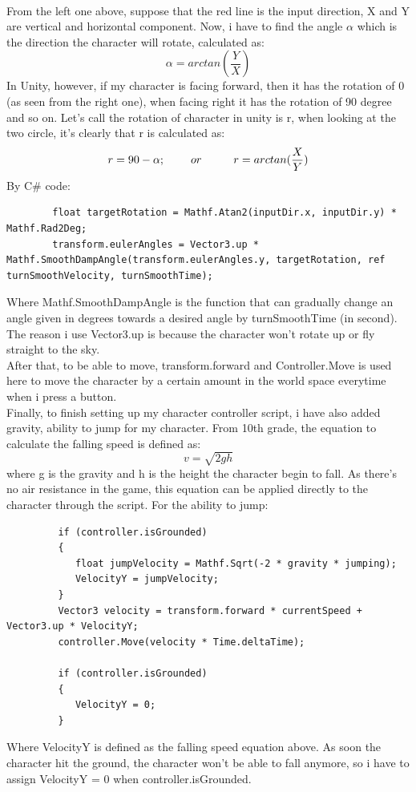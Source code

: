 \documentclass[a4paper, 13pt]{extarticle}
\begin{document}
 	 	\\[0.02cm]
 	 	From the left one above, suppose that the red line is the input direction, X and Y are vertical and horizontal component. Now, i have to find the angle {$\alpha$} which is the direction the character will rotate, calculated as: 
 	 	\\[-0.5cm]
 	 	\[\alpha = arctan(\frac{Y}{X})\]
 	 	In Unity, however, if my character is facing forward, then it has the rotation of 0 (as seen from the right one), when facing right it has the rotation of 90 degree and so on. Let's call the rotation of character in unity is r, when looking at the two circle, it's clearly that r is calculated as: \\[-0.5cm]
 	 	 \[r = 90 - \alpha; \hspace{0.8cm} or \hspace{1.0cm} r = arctan(\frac{X}{Y})\] 
 	 	By C\# code:
 	 	\begin{lstlisting}
 	 	float targetRotation = Mathf.Atan2(inputDir.x, inputDir.y) * Mathf.Rad2Deg;
 	 	transform.eulerAngles = Vector3.up * Mathf.SmoothDampAngle(transform.eulerAngles.y, targetRotation, ref turnSmoothVelocity, turnSmoothTime);
 	 	\end{lstlisting}
 	 	
 	 	Where Mathf.SmoothDampAngle is the function that can gradually change an angle given in degrees towards a desired angle by turnSmoothTime (in second). The reason i use Vector3.up is because the character won't rotate up or fly straight to the sky.  \\[0.15cm] After that, to be able to move, transform.forward and Controller.Move is used here to move the character by a certain amount in the world space everytime when i press a button. \\[0.15cm] Finally, to finish setting up my character controller script, i have also added gravity, ability to jump for my character. From 10th grade, the equation to calculate the falling speed is defined as: 
 	 	\\[-0.5cm]
 	 	 \[v = \sqrt{2gh}\]
 	 	 where g is the gravity and h is the height the character begin to fall. As there's no air resistance in the game, this equation can be applied directly to the character through the script. For the ability to jump:
 	 	 \begin{lstlisting}
 	 	 if (controller.isGrounded)
 	 	 {
 	 	 	float jumpVelocity = Mathf.Sqrt(-2 * gravity * jumping);
 	 	 	VelocityY = jumpVelocity;
 	 	 }
 	 	 Vector3 velocity = transform.forward * currentSpeed + Vector3.up * VelocityY;
 	 	 controller.Move(velocity * Time.deltaTime);
 	 	 
 	 	 if (controller.isGrounded)
 	 	 {
 	 	 	VelocityY = 0;  
 	 	 }
 	 	 \end{lstlisting}
 	 	 Where VelocityY is defined as the falling speed equation above. As soon the character hit the ground, the character won't be able to fall anymore, so i have to assign VelocityY = 0 when controller.isGrounded. 
\end{document}
